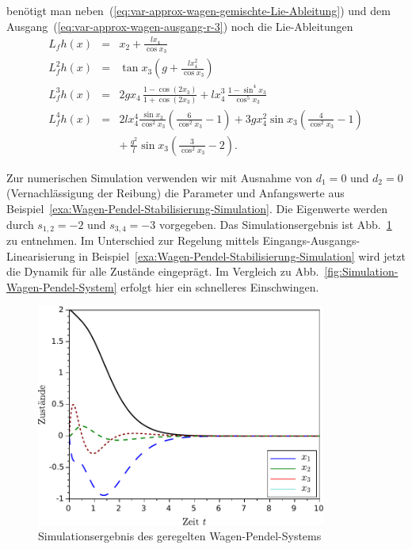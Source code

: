 \begin{example}
benötigt man neben~(\ref{eq:var-approx-wagen-gemischte-Lie-Ableitung})
und dem Ausgang~(\ref{eq:var-approx-wagen-ausgang-r-3}) noch die
Lie-Ableitungen
\[
\begin{array}{lcl}
L_{f}h(x) & = & x_{2}+\frac{lx_{4}}{\cos x_{3}}\\
L_{f}^{2}h(x) & = & \tan x_{3}\left(g+\frac{lx_{4}^{2}}{\cos x_{3}}\right)\\
L_{f}^{3}h(x) & = & 2gx_{4}\,\frac{1-\cos(2x_{3})}{1+\cos(2x_{3})}+lx_{4}^{3}\,\frac{1-\sin^{4}x_{3}}{\cos^{5}x_{3}}\\
L_{f}^{4}h(x) & = & 2lx_{4}^{4}\frac{\sin x_{3}}{\cos^{2}x_{3}}\left(\frac{6}{\cos^{2}x_{3}}-1\right)+3gx_{4}^{2}\sin x_{3}\left(\frac{4}{\cos^{2}x_{3}}-1\right)\\
 &  & +\,\frac{g^{2}}{l}\sin x_{3}\left(\frac{3}{\cos^{2}x_{3}}-2\right).
\end{array}
\]

Zur numerischen Simulation verwenden wir mit Ausnahme von $d_{1}=0$
und $d_{2}=0$ (Vernachlässigung der Reibung) die Parameter und Anfangswerte
aus Beispiel~\ref{exa:Wagen-Pendel-Stabilisierung-Simulation}. Die
Eigenwerte werden durch $s_{1,2}=-2$ und $s_{3,4}=-3$ vorgegeben.
Das Simulationsergebnis ist Abb.~\ref{fig:Simulation-Wagen-Pendel-Approx-Lin}
zu entnehmen. Im Unterschied zur Regelung mittels Eingangs-Ausgangs-Linearisierung
in Beispiel~\ref{exa:Wagen-Pendel-Stabilisierung-Simulation} wird
jetzt die Dynamik für alle Zustände eingeprägt. Im Vergleich zu Abb.~\ref{fig:Simulation-Wagen-Pendel-System}
erfolgt hier ein schnelleres Einschwingen.
\end{example}
\begin{figure}
\begin{centering}
\includegraphics[width=0.85\textwidth]{Wagen_Pendel_Approx}
\par\end{centering}
\caption{Simulationsergebnis des geregelten Wagen-Pendel-Systems\label{fig:Simulation-Wagen-Pendel-Approx-Lin}}
\end{figure}

